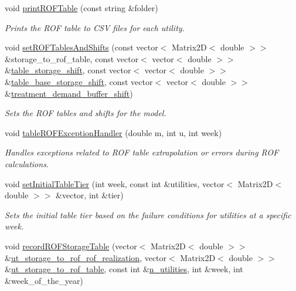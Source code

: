 \begin{DoxyCompactItemize}
void \mbox{\hyperlink{classContinuityModelROF_a1bb8362ce39e694937a787805613e106}{print\+R\+O\+F\+Table}} (const string \&folder)
\begin{DoxyCompactList}\small\item\em Prints the R\+OF table to C\+SV files for each utility. \end{DoxyCompactList}\item 
void \mbox{\hyperlink{classContinuityModelROF_a83fc5e19e0f92d12d659c3446b90fa13}{set\+R\+O\+F\+Tables\+And\+Shifts}} (const vector$<$ Matrix2D$<$ double $>$$>$ \&storage\+\_\+to\+\_\+rof\+\_\+table, const vector$<$ vector$<$ double $>$$>$ \&\mbox{\hyperlink{classContinuityModelROF_a1a90c8816944aab36f395e89f7b84c06}{table\+\_\+storage\+\_\+shift}}, const vector$<$ vector$<$ double $>$$>$ \&\mbox{\hyperlink{classContinuityModelROF_a2bc5728653819a0d54a36ffbb1df44a3}{table\+\_\+base\+\_\+storage\+\_\+shift}}, const vector$<$ vector$<$ double $>$$>$ \&\mbox{\hyperlink{classContinuityModelROF_aedb1313e889617d718d2a93d719cb3f1}{treatment\+\_\+demand\+\_\+buffer\+\_\+shift}})
\begin{DoxyCompactList}\small\item\em Sets the R\+OF tables and shifts for the model. \end{DoxyCompactList}\item 
void \mbox{\hyperlink{classContinuityModelROF_a10a8a95f3177d305d3881e654f01d65d}{table\+R\+O\+F\+Exception\+Handler}} (double m, int u, int week)
\begin{DoxyCompactList}\small\item\em Handles exceptions related to R\+OF table extrapolation or errors during R\+OF calculations. \end{DoxyCompactList}\item 
void \mbox{\hyperlink{classContinuityModelROF_a0c46d5905f5d0ae2cf0abd0d4653bbc7}{set\+Initial\+Table\+Tier}} (int week, const int \&utilities, vector$<$ Matrix2D$<$ double $>$$>$ \&vector, int \&tier)
\begin{DoxyCompactList}\small\item\em Sets the initial table tier based on the failure conditions for utilities at a specific week. \end{DoxyCompactList}\item 
void \mbox{\hyperlink{classContinuityModelROF_aa2348a2a5dea751462771ef538243e75}{record\+R\+O\+F\+Storage\+Table}} (vector$<$ Matrix2D$<$ double $>$$>$ \&\mbox{\hyperlink{classContinuityModelROF_ab4b11938d295e5e74e9cf58725d36a34}{ut\+\_\+storage\+\_\+to\+\_\+rof\+\_\+rof\+\_\+realization}}, vector$<$ Matrix2D$<$ double $>$$>$ \&\mbox{\hyperlink{classContinuityModelROF_ada25d241caf860255ad00097f5e7adb6}{ut\+\_\+storage\+\_\+to\+\_\+rof\+\_\+table}}, const int \&\mbox{\hyperlink{classContinuityModel_a6df6198ebc99a099df08f4b8ce6b52b9}{n\+\_\+utilities}}, int \&week, int \&week\+\_\+of\+\_\+the\+\_\+year)
$$
\end{DoxyCompactItemize}
